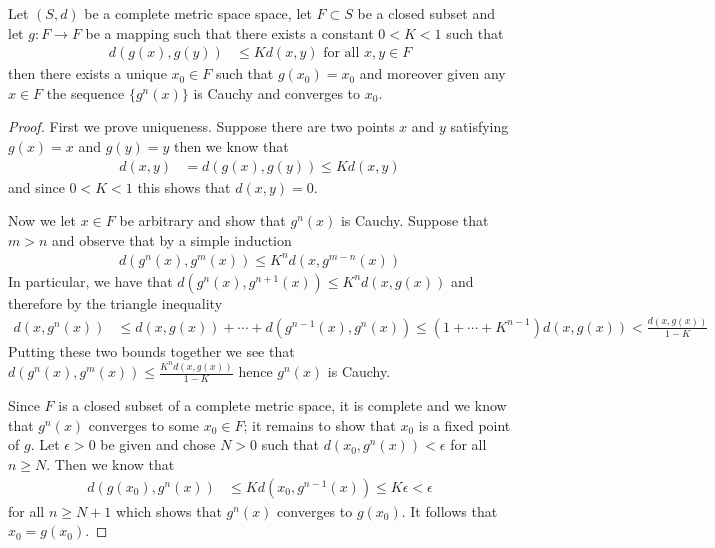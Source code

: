 \begin{prop}\label{ContractionMappingPrinciple}Let $(S,d)$ be a complete
  metric space
  space, let $F \subset S$ be a closed subset and let $g : F \to F$ be
  a mapping such that there exists a constant $0 < K < 1$ such that 
\begin{align*}
d(g(x), g(y)) &\leq K d(x,y) \text{ for all $x,y \in F$}
\end{align*}
then there exists a unique $x_0 \in F$ such that $g(x_0) = x_0$ and
moreover given any $x \in F$ the sequence $\lbrace g^n(x) \rbrace$ is
Cauchy and converges to $x_0$.
\end{prop}
\begin{proof}
First we prove uniqueness.  Suppose there are two points $x$ and $y$
satisfying $g(x) = x$ and $g(y) = y$ then we know that
\begin{align*}
d(x,y) &= d(g(x), g(y)) \leq K d(x,y)
\end{align*}
and since $0 < K < 1$ this shows that $d(x,y) = 0$.

Now we let $x \in F$ be arbitrary and show that $g^n(x)$ is Cauchy.
Suppose that $m > n$ and observe that by a simple induction
\begin{align*}
d(g^n(x), g^m(x)) \leq K^n d(x, g^{m-n}(x))
\end{align*}
In particular, we have that $d(g^n(x), g^{n+1}(x)) \leq K^n d(x,g(x))$
and therefore by the triangle inequality 
\begin{align*}
d(x, g^n(x)) &\leq d(x, g(x)) + \dotsm + d(g^{n-1}(x), g^n(x)) \leq (1
               + \dotsm + K^{n-1}) d(x,g(x)) < \frac{d(x,g(x))}{1-K}
\end{align*}
Putting these two bounds together we see that $d(g^n(x), g^m(x)) \leq  \frac{K^n
  d(x,g(x))}{1-K}$ hence $g^n(x)$ is Cauchy.  

Since $F$ is
a closed subset of a complete metric space, it is 
complete and we know that $g^n(x)$ converges to some $x_0 \in F$; it remains to show that $x_0$
is a fixed point of $g$.  Let $\epsilon > 0$ be given and chose $N >
0$ such that $d(x_0, g^n(x)) < \epsilon$ for all $n \geq N$.  Then we
know that 
\begin{align*}
d(g(x_0), g^n(x)) &\leq K d(x_0, g^{n-1}(x)) \leq K\epsilon < \epsilon
\end{align*}
for all $n \geq N+1$ which shows that $g^n(x)$ converges to $g(x_0)$.  It
follows that $x_0 = g(x_0)$.
\end{proof}

